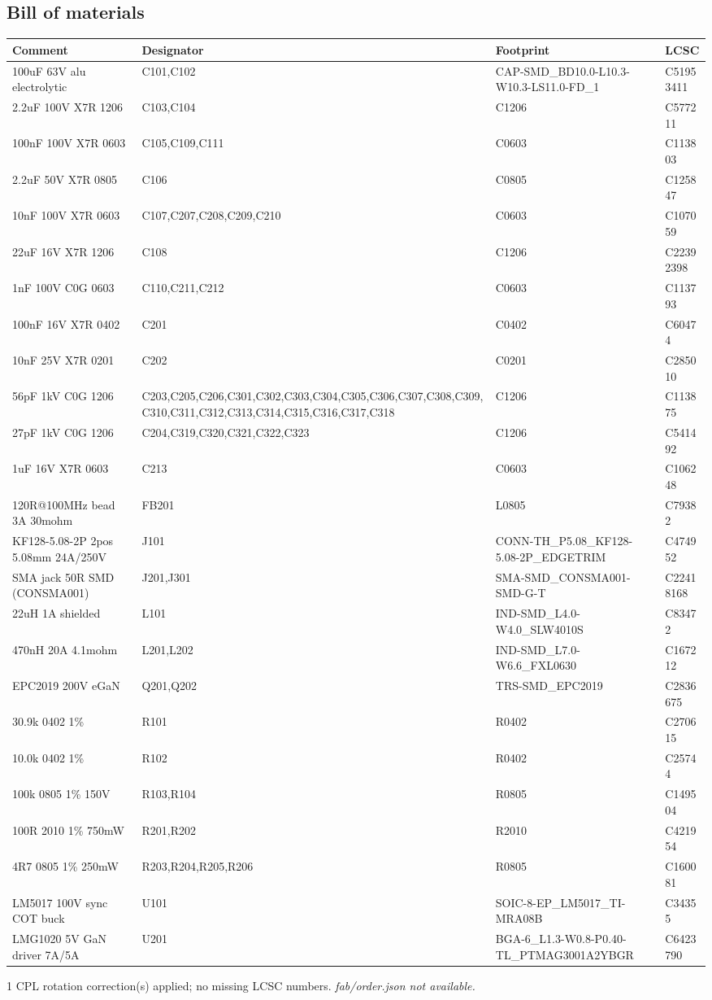 \documentclass[11pt,a4paper]{article}
\begin{document}
\subsection*{Bill of materials}
{\small
\begin{longtable}{p{4.4cm}p{2.8cm}p{4.6cm}l}
\toprule
\textbf{Comment} & \textbf{Designator} & \textbf{Footprint} & \textbf{LCSC} \\
\midrule
\endhead
100uF 63V alu electrolytic & C101,C102 & CAP-SMD\_BD10.0-L10.3-W10.3-LS11.0-FD\_1 & C51953411 \\
2.2uF 100V X7R 1206 & C103,C104 & C1206 & C577211 \\
100nF 100V X7R 0603 & C105,C109,C111 & C0603 & C113803 \\
2.2uF 50V X7R 0805 & C106 & C0805 & C125847 \\
10nF 100V X7R 0603 & C107,C207,C208,C209,C210 & C0603 & C107059 \\
22uF 16V X7R 1206 & C108 & C1206 & C22392398 \\
1nF 100V C0G 0603 & C110,C211,C212 & C0603 & C113793 \\
100nF 16V X7R 0402 & C201 & C0402 & C60474 \\
10nF 25V X7R 0201 & C202 & C0201 & C285010 \\
56pF 1kV C0G 1206 & C203,C205,C206,C301,C302,C303,C304,C305,C306,C307,C308,C309,C310,C311,C312,C313,C314,C315,C316,C317,C318 & C1206 & C113875 \\
27pF 1kV C0G 1206 & C204,C319,C320,C321,C322,C323 & C1206 & C541492 \\
1uF 16V X7R 0603 & C213 & C0603 & C106248 \\
120R@100MHz bead 3A 30mohm & FB201 & L0805 & C79382 \\
KF128-5.08-2P 2pos 5.08mm 24A/250V & J101 & CONN-TH\_P5.08\_KF128-5.08-2P\_EDGETRIM & C474952 \\
SMA jack 50R SMD (CONSMA001) & J201,J301 & SMA-SMD\_CONSMA001-SMD-G-T & C22418168 \\
22uH 1A shielded & L101 & IND-SMD\_L4.0-W4.0\_SLW4010S & C83472 \\
470nH 20A 4.1mohm & L201,L202 & IND-SMD\_L7.0-W6.6\_FXL0630 & C167212 \\
EPC2019 200V eGaN & Q201,Q202 & TRS-SMD\_EPC2019 & C2836675 \\
30.9k 0402 1\% & R101 & R0402 & C270615 \\
10.0k 0402 1\% & R102 & R0402 & C25744 \\
100k 0805 1\% 150V & R103,R104 & R0805 & C149504 \\
100R 2010 1\% 750mW & R201,R202 & R2010 & C421954 \\
4R7 0805 1\% 250mW & R203,R204,R205,R206 & R0805 & C160081 \\
LM5017 100V sync COT buck & U101 & SOIC-8-EP\_LM5017\_TI-MRA08B & C34355 \\
LMG1020 5V GaN driver 7A/5A & U201 & BGA-6\_L1.3-W0.8-P0.40-TL\_PTMAG3001A2YBGR & C6423790 \\
\bottomrule
\end{longtable}
}
1 CPL rotation correction(s) applied; no missing LCSC numbers.
\emph{fab/order.json not available.}
\end{document}
